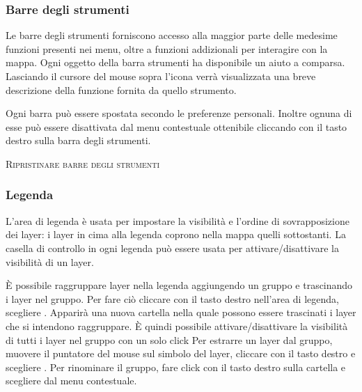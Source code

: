 
\subsubsection{Barre degli strumenti}\label{label_toolbars}

Le barre degli strumenti forniscono accesso alla maggior parte delle medesime funzioni presenti nei menu,
oltre a funzioni addizionali per interagire con la mappa. Ogni oggetto della barra strumenti
ha disponibile un aiuto a comparsa. Lasciando il cursore del mouse sopra l'icona verrà
visualizzata una breve descrizione della funzione fornita da quello strumento.

Ogni barra può essere spostata secondo le preferenze personali. Inoltre ognuna di esse
può essere disattivata dal menu contestuale ottenibile cliccando con il tasto destro
sulla barra degli strumenti.

\begin{Tip}
\caption{\textsc{Ripristinare barre degli strumenti}} 
\end{Tip}

\subsubsection{Legenda}\label{label_legend}

L'area di legenda è usata per impostare la visibilità e l'ordine di sovrapposizione dei layer:
i layer in cima alla legenda coprono nella mappa quelli sottostanti.
La casella di controllo in ogni legenda può essere usata per attivare/disattivare la 
visibilità di un layer.

È possibile raggruppare layer nella legenda aggiungendo un gruppo e trascinando i layer nel gruppo.
Per fare ciò cliccare con il tasto destro nell'area di legenda, scegliere . 
Apparirà una nuova cartella nella quale possono essere trascinati i layer che si intendono raggruppare.
È quindi possibile attivare/disattivare la visibilità di tutti i layer nel gruppo con un solo click
Per estrarre un layer dal gruppo, muovere il puntatore del mouse sul simbolo del layer,
cliccare con il tasto destro e scegliere .
Per rinominare il gruppo, fare click con il tasto destro sulla cartella e scegliere
 dal menu contestuale.

